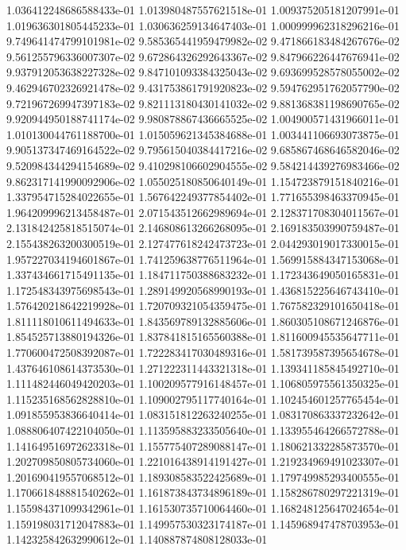 1.036412248686588433e-01
1.013980487557621518e-01
1.009375205181207991e-01
1.019636301805445233e-01
1.030636259134647403e-01
1.000999962318296216e-01
9.749641474799101981e-02
9.585365441959479982e-02
9.471866183484267676e-02
9.561255796336007307e-02
9.672864326292643367e-02
9.847966226447676941e-02
9.937912053638227328e-02
9.847101093384325043e-02
9.693699528578055002e-02
9.462946702326921478e-02
9.431753861791920823e-02
9.594762951762057790e-02
9.721967269947397183e-02
9.821113180430141032e-02
9.881368381198690765e-02
9.920944950188741174e-02
9.980878867436665525e-02
1.004900571431966011e-01
1.010130044761188700e-01
1.015059621345384688e-01
1.003441106693073875e-01
9.905137347469164522e-02
9.795615040384417216e-02
9.685867468646582046e-02
9.520984344294154689e-02
9.410298106602904555e-02
9.584214439276983466e-02
9.862317141990092906e-02
1.055025180850640149e-01
1.154723879151840216e-01
1.337954715284022655e-01
1.567642249377854402e-01
1.771655398463370945e-01
1.964209996213458487e-01
2.071543512662989694e-01
2.128371708304011567e-01
2.131842425818515074e-01
2.146808613266268095e-01
2.169183503990759487e-01
2.155438263200300519e-01
2.127477618242473723e-01
2.044293019017330015e-01
1.957227034194601867e-01
1.741259638776511964e-01
1.569915884347153068e-01
1.337434661715491135e-01
1.184711750388683232e-01
1.172343649050165831e-01
1.172548343975698543e-01
1.289149920568990193e-01
1.436815225646743410e-01
1.576420218642219928e-01
1.720709321054359475e-01
1.767582329101650418e-01
1.811118010611494633e-01
1.843569789132885606e-01
1.860305108671246876e-01
1.854525713880194326e-01
1.837841815165560388e-01
1.811600945535647711e-01
1.770600472508392087e-01
1.722283417030489316e-01
1.581739587395654678e-01
1.437646108614373530e-01
1.271222311443321318e-01
1.139341185845492710e-01
1.111482446049420203e-01
1.100209577916148457e-01
1.106805975561350325e-01
1.115235168562828810e-01
1.109002795117740164e-01
1.102454601257765454e-01
1.091855953836640414e-01
1.083151812263240255e-01
1.083170863337232642e-01
1.088806407422104050e-01
1.113595883233505640e-01
1.133955464266572788e-01
1.141649516972623318e-01
1.155775407289088147e-01
1.180621332285873570e-01
1.202709850805734060e-01
1.221016438914191427e-01
1.219234969491023307e-01
1.201690419557068512e-01
1.189308583522425689e-01
1.179749985293400555e-01
1.170661848881540262e-01
1.161873843734896189e-01
1.158286780297221319e-01
1.155984371099342961e-01
1.161530735710064460e-01
1.168248125647024654e-01
1.159198031712047883e-01
1.149957530323174187e-01
1.145968947478703953e-01
1.142325842632990612e-01
1.140887874808128033e-01
